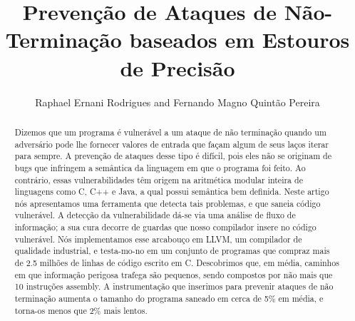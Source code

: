 \documentclass{llncs}
\begin{document}
\title{Prevenção de Ataques de Não-Terminação baseados em
Estouros de Precisão}

\author{Raphael Ernani Rodrigues and Fernando Magno Quintão Pereira}



\maketitle

\begin{abstract}
Dizemos que um programa é vulnerável a um ataque de não terminação quando
um adversário pode lhe fornecer valores de entrada que façam algum de seus laços 
iterar para sempre.
A prevenção de ataques desse tipo é difícil, pois eles não se originam de bugs 
que infringem a semântica da linguagem em que o programa foi feito.
Ao contrário, essas vulnerabilidades têm origem na aritmética modular inteira de 
linguagens como C, C++ e Java, a qual possui semântica bem definida.
Neste artigo nós apresentamos uma ferramenta que detecta tais problemas, 
e que saneia código vulnerável.
A detecção da vulnerabilidade dá-se via uma análise de fluxo de informação;
a sua cura decorre de guardas que nosso compilador insere no código vulnerável.
Nós implementamos esse arcabouço em LLVM, um compilador de qualidade industrial, 
e testa-mo-no em um conjunto de programas que compraz mais de
2.5 milhões de linhas de código escrito em C.
Descobrimos que, em média, caminhos em que informação perigosa trafega são 
pequenos, sendo compostos por não mais que 10 instruções assembly.
A instrumentação que inserimos para prevenir ataques de não terminação aumenta o 
tamanho do programa saneado em cerca de 5\% em média, e torna-os menos que 2\% 
mais lentos.
\end{abstract}
\end{document}
